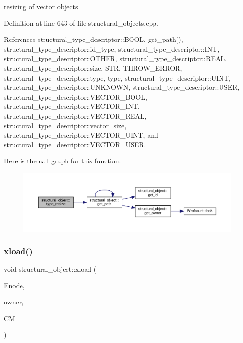 resizing of vector objects 



Definition at line 643 of file structural\+\_\+objects.\+cpp.



References structural\+\_\+type\+\_\+descriptor\+::\+B\+O\+OL, get\+\_\+path(), structural\+\_\+type\+\_\+descriptor\+::id\+\_\+type, structural\+\_\+type\+\_\+descriptor\+::\+I\+NT, structural\+\_\+type\+\_\+descriptor\+::\+O\+T\+H\+ER, structural\+\_\+type\+\_\+descriptor\+::\+R\+E\+AL, structural\+\_\+type\+\_\+descriptor\+::size, S\+TR, T\+H\+R\+O\+W\+\_\+\+E\+R\+R\+OR, structural\+\_\+type\+\_\+descriptor\+::type, type, structural\+\_\+type\+\_\+descriptor\+::\+U\+I\+NT, structural\+\_\+type\+\_\+descriptor\+::\+U\+N\+K\+N\+O\+WN, structural\+\_\+type\+\_\+descriptor\+::\+U\+S\+ER, structural\+\_\+type\+\_\+descriptor\+::\+V\+E\+C\+T\+O\+R\+\_\+\+B\+O\+OL, structural\+\_\+type\+\_\+descriptor\+::\+V\+E\+C\+T\+O\+R\+\_\+\+I\+NT, structural\+\_\+type\+\_\+descriptor\+::\+V\+E\+C\+T\+O\+R\+\_\+\+R\+E\+AL, structural\+\_\+type\+\_\+descriptor\+::vector\+\_\+size, structural\+\_\+type\+\_\+descriptor\+::\+V\+E\+C\+T\+O\+R\+\_\+\+U\+I\+NT, and structural\+\_\+type\+\_\+descriptor\+::\+V\+E\+C\+T\+O\+R\+\_\+\+U\+S\+ER.

Here is the call graph for this function\+:
\nopagebreak
\begin{figure}[H]
\begin{center}
\leavevmode
\includegraphics[width=350pt]{d8/da3/classstructural__object_ad14f4fa94f96ad1e6709027ef7001f37_cgraph}
\end{center}
\end{figure}
\mbox{\label{classstructural__object_a9a964af7fe7e95b34d03bb514756bb33}} 
\subsubsection{\texorpdfstring{xload()}{xload()}}
{\footnotesize\ttfamily void structural\+\_\+object\+::xload (\begin{DoxyParamCaption}\item[{const \hyperlink{classxml__element}{xml\+\_\+element} $\ast$}]{Enode,  }\item[{\hyperlink{structural__objects_8hpp_a8ea5f8cc50ab8f4c31e2751074ff60b2}{structural\+\_\+object\+Ref}}]{owner,  }\item[{\hyperlink{structural__manager_8hpp_ab3136f0e785d8535f8d252a7b53db5b5}{structural\+\_\+manager\+Ref} const \&}]{CM }\end{DoxyParamCaption})\hspace{0.3cm}{\ttfamily [virtual]}}



